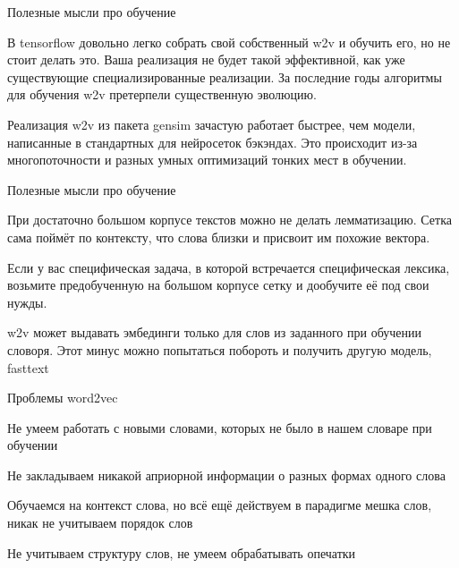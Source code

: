 \documentclass[notes,12pt, aspectratio=169]{beamer}
\newenvironment{wideitemize}{\itemize\addtolength{\itemsep}{10pt}}{\enditemize}
\begin{document}
\begin{frame}{Полезные мысли про обучение}
\begin{wideitemize} 
	\item В tensorflow довольно легко собрать свой собственный w2v и обучить его, но не стоит делать это.  Ваша реализация не будет такой эффективной, как уже существующие специализированные реализации. За последние годы алгоритмы для обучения w2v претерпели существенную эволюцию. 
	
	\item   Реализация w2v из пакета gensim зачастую работает быстрее, чем модели, написанные в стандартных для нейросеток бэкэндах. Это происходит из-за многопоточности и разных умных оптимизаций тонких мест в обучении. 
\end{wideitemize} 
\end{frame} 



\begin{frame}{Полезные мысли про обучение}
\begin{wideitemize} 
\item  При достаточно большом корпусе текстов можно не делать лемматизацию. Сетка сама поймёт по контексту, что слова близки и присвоит им похожие вектора.

\item Если у вас специфическая задача, в которой встречается специфическая лексика, возьмите предобученную на большом корпусе сетку и дообучите её под свои нужды.

\item \alert{w2v может выдавать эмбединги только для слов из заданного при обучении словоря.} Этот минус можно попытаться побороть и получить другую модель, fasttext
\end{wideitemize} 
\end{frame} 


\begin{frame}{Проблемы word2vec}
\begin{wideitemize} 
	\item Не умеем работать с новыми словами, которых не было в нашем словаре при обучении
	
	\item  Не закладываем никакой априорной информации о разных
	формах одного слова
	
	\item  Обучаемся на контекст слова, но всё ещё действуем в парадигме мешка слов, никак не учитываем порядок слов
	
	\item Не учитываем структуру слов, не умеем обрабатывать опечатки	
\end{wideitemize} 
\end{frame} 
\end{document}
